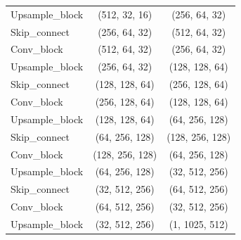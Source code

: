 \begin{tabular}{l c c}
    Upsample\_block & (512, 32, 16) & (256, 64, 32) \\
    Skip\_connect & (256, 64, 32) & (512, 64, 32)\\
    Conv\_block & (512, 64, 32) & (256, 64, 32) \\
    Upsample\_block & (256, 64, 32) & (128, 128, 64) \\
    Skip\_connect & (128, 128, 64) & (256, 128, 64) \\
    Conv\_block & (256, 128, 64) & (128, 128, 64) \\
    Upsample\_block & (128, 128, 64) & (64, 256, 128) \\
    Skip\_connect & (64, 256, 128) & (128, 256, 128) \\
    Conv\_block & (128, 256, 128) & (64, 256, 128) \\
    Upsample\_block & (64, 256, 128) & (32, 512, 256) \\
    Skip\_connect & (32, 512, 256) & (64, 512, 256) \\
    Conv\_block & (64, 512, 256) & (32, 512, 256) \\
    Upsample\_block & (32, 512, 256) & (1, 1025, 512) \\
\bottomrule
\end{tabular}